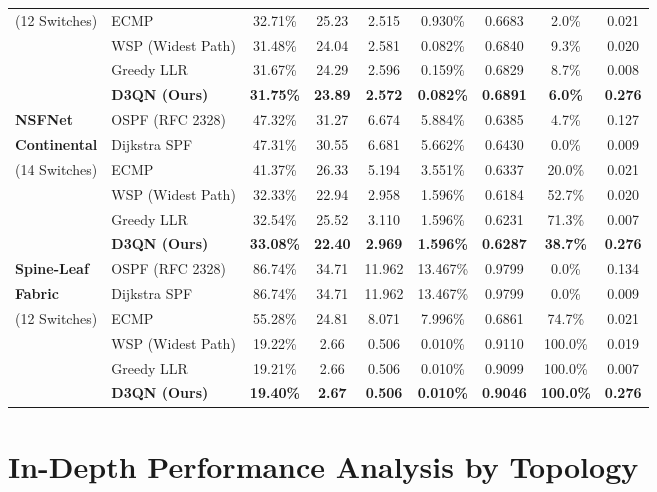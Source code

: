 \begin{table}[htbp]
\begin{tabularx}{\textwidth}{l l c c c c c c c}
(12 Switches) & ECMP & 32.71\% & 25.23 & 2.515 & 0.930\% & 0.6683 & 2.0\% & 0.021 \\
& WSP (Widest Path) & 31.48\% & 24.04 & 2.581 & 0.082\% & 0.6840 & 9.3\% & 0.020 \\
& Greedy LLR & 31.67\% & 24.29 & 2.596 & 0.159\% & 0.6829 & 8.7\% & 0.008 \\
& \textbf{D3QN (Ours)} & \textbf{31.75\%} & \textbf{23.89} & \textbf{2.572} & \textbf{0.082\%} & \textbf{0.6891} & \textbf{6.0\%} & \textbf{0.276} \\
\midrule
\textbf{NSFNet} & OSPF (RFC 2328) & 47.32\% & 31.27 & 6.674 & 5.884\% & 0.6385 & 4.7\% & 0.127 \\
\textbf{Continental} & Dijkstra SPF & 47.31\% & 30.55 & 6.681 & 5.662\% & 0.6430 & 0.0\% & 0.009 \\
(14 Switches) & ECMP & 41.37\% & 26.33 & 5.194 & 3.551\% & 0.6337 & 20.0\% & 0.021 \\
& WSP (Widest Path) & 32.33\% & 22.94 & 2.958 & 1.596\% & 0.6184 & 52.7\% & 0.020 \\
& Greedy LLR & 32.54\% & 25.52 & 3.110 & 1.596\% & 0.6231 & 71.3\% & 0.007 \\
& \textbf{D3QN (Ours)} & \textbf{33.08\%} & \textbf{22.40} & \textbf{2.969} & \textbf{1.596\%} & \textbf{0.6287} & \textbf{38.7\%} & \textbf{0.276} \\
\midrule
\textbf{Spine-Leaf} & OSPF (RFC 2328) & 86.74\% & 34.71 & 11.962 & 13.467\% & 0.9799 & 0.0\% & 0.134 \\
\textbf{Fabric} & Dijkstra SPF & 86.74\% & 34.71 & 11.962 & 13.467\% & 0.9799 & 0.0\% & 0.009 \\
(12 Switches) & ECMP & 55.28\% & 24.81 & 8.071 & 7.996\% & 0.6861 & 74.7\% & 0.021 \\
& WSP (Widest Path) & 19.22\% & 2.66 & 0.506 & 0.010\% & 0.9110 & 100.0\% & 0.019 \\
& Greedy LLR & 19.21\% & 2.66 & 0.506 & 0.010\% & 0.9099 & 100.0\% & 0.007 \\
& \textbf{D3QN (Ours)} & \textbf{19.40\%} & \textbf{2.67} & \textbf{0.506} & \textbf{0.010\%} & \textbf{0.9046} & \textbf{100.0\%} & \textbf{0.276} \\
\bottomrule
\end{tabularx}
\end{table}

\section{In-Depth Performance Analysis by Topology}

